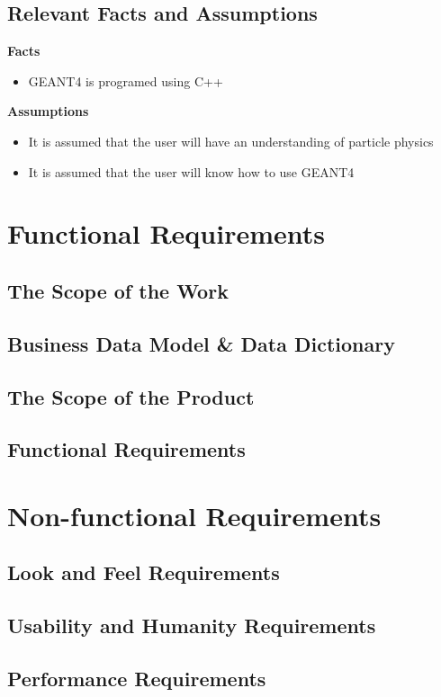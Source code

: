 \documentclass[12pt]{article}
\begin{document}
\subsection{Relevant Facts and Assumptions} %
\textbf{Facts}
\begin{itemize}
	\item GEANT4 is programed using C++
\end{itemize}
\textbf{Assumptions}
 \begin{itemize}
	\item It is assumed that the user will have an understanding of particle physics
	\item It is assumed that the user will know how to use GEANT4
\end{itemize}
\section{Functional Requirements}
\subsection{The Scope of the Work} %
\subsection{Business Data Model \& Data Dictionary} %
\subsection{The Scope of the Product} %
\subsection{Functional Requirements} %

\section{Non-functional Requirements}
\subsection{Look and Feel Requirements} %
\subsection{Usability and Humanity Requirements} %
\subsection{Performance Requirements} %
\end{document}
